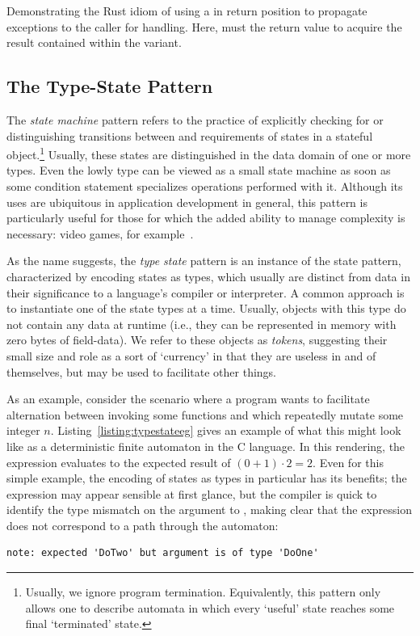 \begin{listing}[ht]
	\centering
	\inputminted[]{rust}{enums.rs}
	\caption[TODO.]{Demonstrating the Rust idiom of using a  in return position to propagate exceptions to the caller for handling. Here,  must  the return value to acquire the result contained within the  variant.}
	\label{listing:enums}
\end{listing}

\subsection{The Type-State Pattern}
\label{sec:type_state}

The \textit{state machine} pattern refers to the practice of explicitly checking for or distinguishing transitions between and requirements of states in a stateful object.\footnote{Usually, we ignore program termination. Equivalently, this pattern only allows one to describe automata in which every `useful' state reaches some final `terminated' state.} Usually, these states are distinguished in the data domain of one or more types. Even the lowly  type can be viewed as a small state machine as soon as some condition statement specializes operations performed with it. Although its uses are ubiquitous in application development in general, this pattern is particularly useful for those for which the added ability to manage complexity is necessary: video games, for example~\cite{nystrom2014game}.

As the name suggests, the \textit{type state} pattern is an instance of the state pattern, characterized by encoding states as types, which usually are distinct from data in their significance to a language's compiler or interpreter. A common approach is to instantiate one of the state types at a time. Usually, objects with this type do not contain any data at runtime (i.e., they can be represented in memory with zero bytes of field-data). We refer to these objects as \textit{tokens}, suggesting their small size and role as a sort of `currency' in that they are useless in and of themselves, but may be used to facilitate other things.

As an example, consider the scenario where a program wants to facilitate alternation between invoking some functions  and  which repeatedly mutate some integer $n$. Listing~\ref{listing:typestateeg} gives an example of what this might look like as a deterministic finite automaton in the C language. In this rendering, the expression  evaluates to the expected result of $(0 + 1) \cdot{} 2 = 2$. Even for this simple example, the encoding of states as types in particular has its benefits; the expression  may appear sensible at first glance, but the compiler is quick to identify the type mismatch on the argument to , making clear that the expression does not correspond to a path through the automaton:
\begin{verbatim}
note: expected 'DoTwo' but argument is of type 'DoOne'
\end{verbatim}

